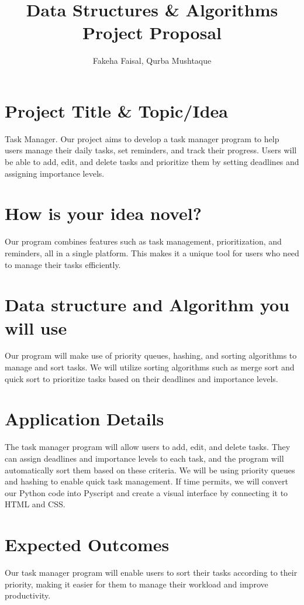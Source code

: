 \documentclass{article}
\begin{document}
\title{Data Structures \& Algorithms Project Proposal}
\author{Fakeha Faisal, Qurba Mushtaque}
\maketitle

\section{Project Title \& Topic/Idea}
Task Manager. Our project aims to develop a task manager program to help users manage their daily tasks, set reminders, and track their progress. Users will be able to add, edit, and delete tasks and prioritize them by setting deadlines and assigning importance levels.

\section{How is your idea novel?}
Our program combines features such as task management, prioritization, and reminders, all in a single platform. This makes it a unique tool for users who need to manage their tasks efficiently.

\section{Data structure and Algorithm you will use}
Our program will make use of priority queues, hashing, and sorting algorithms to manage and sort tasks. We will utilize sorting algorithms such as merge sort and quick sort to prioritize tasks based on their deadlines and importance levels.

\section{Application Details}
The task manager program will allow users to add, edit, and delete tasks. They can assign deadlines and importance levels to each task, and the program will automatically sort them based on these criteria. We will be using priority queues and hashing to enable quick task management. If time permits, we will convert our Python code into Pyscript and create a visual interface by connecting it to HTML and CSS.

\section{Expected Outcomes}
Our task manager program will enable users to sort their tasks according to their priority, making it easier for them to manage their workload and improve productivity.
\end{document}

